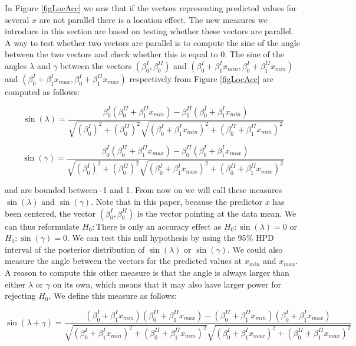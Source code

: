 \documentclass[11pt,]{article}
\begin{document}
In Figure \ref{figLocAcc} we saw that if the vectors representing
predicted values for several \(x\) are not parallel there is a location
effect. The new measures we introduce in this section are based on
testing whether these vectors are parallel. A way to test whether two
vectors are parallel is to compute the sine of the angle between the two
vectors and check whether this is equal to 0. The sine of the angles
\(\lambda\) and \(\gamma\) between the vectors
\((\beta^I_0, \beta^{II}_0)\) and
\((\beta^I_0 + \beta^I_1x_{min}, \beta^I_0 + \beta^{II}_1x_{min})\) and
\((\beta^I_0 + \beta^I_1x_{max}, \beta^I_0 + \beta^{II}_1x_{max})\)
respectively from Figure \ref{figLocAcc} are computed as follows:

\begin{equation}
\sin(\lambda) = \frac{\beta^I_0(\beta^{II}_0 + \beta^{II}_1x_{min}) - \beta^{II}_0(\beta^I_0 + \beta^{I}_1x_{min})}{\sqrt{(\beta^I_0)^2 + (\beta^{II}_0)^2}\sqrt{(\beta^{I}_0 + \beta^{I}_1x_{min})^2 + (\beta^{II}_0 + \beta^{II}_1x_{min})^2}}
\end{equation}

\begin{equation}
\sin(\gamma) = \frac{\beta^I_0(\beta^{II}_0 + \beta^{II}_1x_{max}) - \beta^{II}_0(\beta^I_0 + \beta^{I}_1x_{max})}{\sqrt{(\beta^I_0)^2 + (\beta^{II}_0)^2}\sqrt{(\beta^{I}_0 + \beta^{I}_1x_{max})^2 + (\beta^{II}_0 + \beta^{II}_1x_{max})^2}}
\end{equation}

and are bounded between -1 and 1. From now on we will call these
measures \(\sin(\lambda)\) and \(\sin(\gamma)\). Note that in this
paper, because the predictor \(x\) has been centered, the vector
\((\beta^I_0, \beta^{II}_0)\) is the vector pointing at the data mean.
We can thus reformulate \textit{$H_0:
\text{There is only an accuracy effect}$} as
\textit{$H_0: \sin(\lambda) = 0$} or \textit{$H_0: \sin(\gamma) = 0$}.
We can test this null hypothesis by using the 95\(\%\) HPD interval of
the posterior distribution of \(\sin(\lambda)\) or \(\sin(\gamma)\). We
could also measure the angle between the vectors for the predicted
values at \(x_{min}\) and \(x_{max}\). A reason to compute this other
measure is that the angle is always larger than either \(\lambda\) or
\(\gamma\) on its own, which means that it may also have larger power
for rejecting \textit{$H_0$}. We define this measure as follows:

\begin{equation}
\sin(\lambda + \gamma) = \frac{(\beta^I_0 + \beta^{I}_1x_{min})(\beta^{II}_0 + \beta^{II}_1x_{max}) - (\beta^{II}_0 + \beta^{II}_1x_{min})(\beta^I_0 + \beta^{I}_1x_{max})}{\sqrt{(\beta^I_0 + \beta^{I}_1x_{min})^2 + (\beta^{II}_0 + \beta^{II}_1x_{min})^2}\sqrt{(\beta^{I}_0 + \beta^{I}_1x_{max})^2 + (\beta^{II}_0 + \beta^{II}_1x_{max})^2}}
\end{equation}
\end{document}
